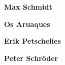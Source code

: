 \textbf{Max Schmidt} \lipsum[1]
	
\textbf{Os Aruaques} \lipsum[2]

\textbf{Erik Petschelies} \lipsum[3]

\textbf{Peter Schröder} \lipsum[4]



